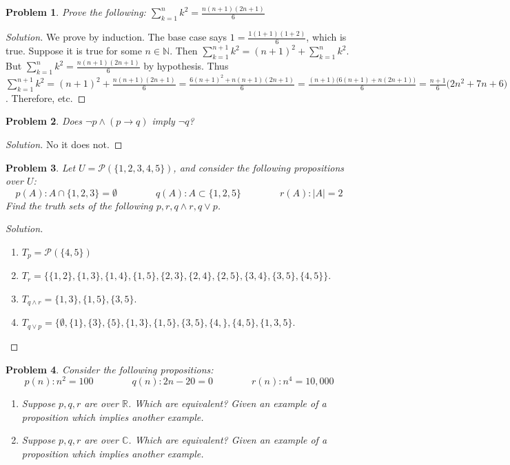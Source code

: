 \documentclass[oneside]{book}
\theoremstyle{mystyle}
\newtheorem{problem}{Problem}[section]
\begin{document}
\begin{problem}
Prove the following: $\sum_{k=1}^{n} k^2 = \frac{n(n+1)(2n+1)}{6}$
\end{problem}
\begin{proof}[Solution]
We prove by induction. The base case says $1 = \frac{1(1+1)(1+2)}{6}$, which is true. Suppose it is true for some $n\in \mathbb{N}$. Then $\sum_{k=1}^{n+1}k^2 = (n+1)^2+\sum_{k=1}^{n} k^2$. But $\sum_{k=1}^{n} k^2 = \frac{n(n+1)(2n+1)}{6}$ by hypothesis. Thus $\sum_{k=1}^{n+1} k^2 = (n+1)^2+\frac{n(n+1)(2n+1)}{6} = \frac{6(n+1)^2+n(n+1)(2n+1)}{6} = \frac{(n+1)\big(6(n+1)+n(2n+1)\big)}{6} = \frac{n+1}{6}\big(2n^2+7n+6\big) = \frac{(n+1)(n+2)(2n+3)}{6} = \frac{(n+1)\big((n+1)+1\big)\big(2(n+1)+1\big)}{6}$. Therefore, etc.
\end{proof}
\begin{problem}
Does $\neg p\land (p\rightarrow q)$ imply $\neg q$?
\end{problem}
\begin{proof}[Solution]
No it does not.
\end{proof}
\begin{problem}
Let $U = \mathcal{P}(\{1,2,3,4,5\})$, and consider the following propositions over $U$:
\begin{equation*}
    p(A): A\cap\{1,2,3\} = \emptyset \quad\quad\quad\quad q(A): A\subset \{1,2,5\} \quad\quad\quad\quad r(A): |A| = 2
\end{equation*}
Find the truth sets of the following $p,r, q\land r, q\lor p$.
\end{problem}
\begin{proof}[Solution]
\
\begin{enumerate}
    \item $T_{p} = \mathcal{P}(\{4,5\})$
    \item $T_{r} = \{\{1,2\},\{1,3\},\{1,4\},\{1,5\},\{2,3\},\{2,4\},\{2,5\},\{3,4\},\{3,5\},\{4,5\}\}$.
    \item $T_{q\land r} = \{1,3\},\{1,5\},\{3,5\}$.
    \item $T_{q\lor p} = \{\emptyset, \{1\},\{3\},\{5\},\{1,3\},\{1,5\},\{3,5\},\{4,\},\{4,5\},\{1,3,5\}$.
\end{enumerate}
\end{proof}
\begin{problem}
Consider the following propositions:
\begin{equation*}
    p(n): n^2 = 100 \quad\quad\quad\quad q(n): 2n-20 = 0 \quad\quad\quad\quad r(n): n^4 = 10,000
\end{equation*}
\begin{enumerate}
    \item Suppose $p,q,r$ are over $\mathbb{R}$. Which are equivalent? Given an example of a proposition which implies another example.
    \item Suppose $p,q,r$ are over $\mathbb{C}$. Which are equivalent? Given an example of a proposition which implies another example.
\end{enumerate}
\end{problem}
\end{document}

